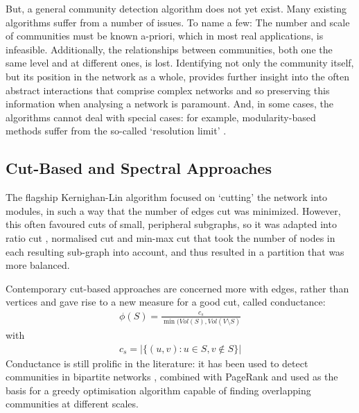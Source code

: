 \documentclass{report}
\begin{document}
	But, a general community detection algorithm does not yet exist.
	Many existing algorithms suffer from a number of issues. 
	To name a few:
	The number and scale of communities must be known a-priori, which in most real applications, is infeasible.
	Additionally, the relationships between communities, both one the same level and at different ones, is lost.
	Identifying not only the community itself, but its position in the network as a whole, provides further insight into the often abstract interactions that comprise complex networks and so preserving this information when analysing a network is paramount.
	And, in some cases, the algorithms cannot deal with special cases: for example, modularity-based methods suffer from the so-called `resolution limit' \cite{fortunato2007resolution}.
	
	\subsection{Cut-Based and Spectral Approaches}
	The flagship Kernighan-Lin algorithm  \cite{kernighan1970efficient} focused on `cutting' the network into modules, in such a way that the number of edges cut was minimized. 
	However, this often favoured cuts of small, peripheral subgraphs, so it was adapted into ratio cut \cite{wei1991ratio}, normalised cut \cite{shi2000normalized} and min-max cut \cite{ding2001min} that took the number of nodes in each resulting sub-graph into account, and thus resulted in a partition that was more balanced.
	
	Contemporary cut-based approaches are concerned more with edges, rather than vertices and gave rise to a new measure for a good cut, called conductance:
	\begin{align}
	\phi(S) = \frac{c_s}{\min(Vol(S),Vol(V \setminus S)} 
	\end{align}
	with
	\begin{align}
	c_s = |\{(u,v) : u \in S, v \not\in S\}|
	\end{align}
	Conductance is still prolific in the literature: it has been used to detect communities in bipartite networks \cite{barber2007modularity}, combined with PageRank \cite{andersen2006local} and used as the basis for a greedy optimisation algorithm \cite{lancichinetti2009community} capable of finding overlapping communities at different scales. 
	
\end{document}

